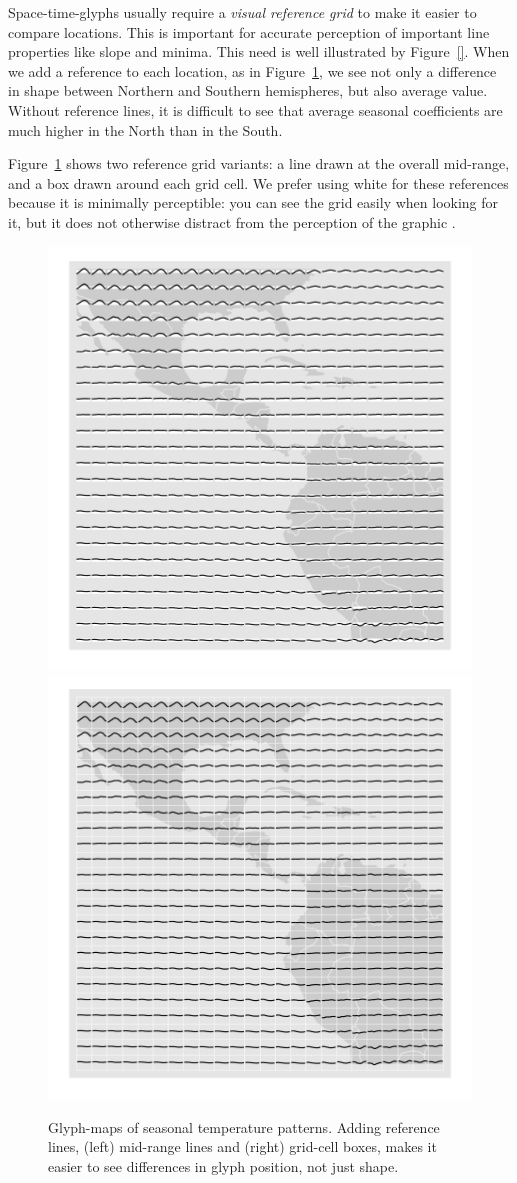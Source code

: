 \documentclass[oneside]{article}
\begin{document}
Space-time-glyphs usually require a \emph{visual reference grid} \citet{cleveland:1993a} to make it easier to compare locations. This is important for accurate perception of important line properties like slope and minima. This need is well illustrated by Figure~\ref{}. When we add a reference to each location, as in Figure~\ref{fig:ref-basic}, we see not only a difference in shape between Northern and Southern hemispheres, but also average value. Without reference lines, it is difficult to see that average seasonal coefficients are much higher in the North than in the South.

Figure~\ref{fig:ref-basic} shows two reference grid variants: a line drawn at the overall mid-range, and a box drawn around each grid cell. We prefer using white for these references because it is minimally perceptible: you can see the grid easily when looking for it, but it does not otherwise distract from the perception of the graphic \citep{carr:1994}.

\begin{figure}[htbp]
  \centering
  \includegraphics[width=0.5\linewidth]{ref-line}%
  \includegraphics[width=0.5\linewidth]{ref-box}

  \caption{Glyph-maps of seasonal temperature patterns. Adding reference lines, (left) mid-range lines and (right) grid-cell boxes, makes it easier to see differences in glyph position, not just shape.}
  \label{fig:ref-basic}
\end{figure}
\end{document}

